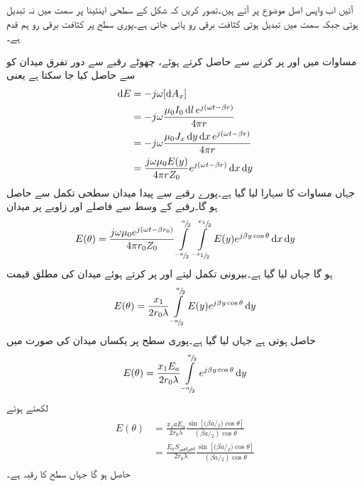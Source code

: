 آئیں اب واپس اصل موضوع پر آتے ہیں۔تصور کریں کہ شکل  کے سطحی اینٹینا پر  سمت میں نہ تبدیل ہوتی جبکہ  سمت میں تبدیل ہوتی کثافت برقی رو  پائی جاتی ہے۔پوری سطح پر کثافت برقی رو ہم قدم ہے۔

مساوات  میں  اور  پر کرنے  سے  حاصل کرتے ہوئے، چھوٹے رقبے   سے دور تفرق میدان کو  سے حاصل کیا جا سکتا ہے یعنی
\begin{gather}
\begin{aligned}
\dif E &=-j \omega [\dif A_x] \\
&=-j \omega \frac{\mu_0 I_0 \dif l \, e^{j(\omega t -\beta r)}}{4\pi r}  \\
&=-j \omega \frac{\mu_0 J_x \dif y \dif x \, e^{j(\omega t -\beta r)}}{4\pi r}  \\
&=\frac{j \omega \mu_0 E(y)}{4\pi r Z_0} e^{j(\omega t-\beta r)} \dif x \dif y
\end{aligned}
\end{gather}
جہاں مساوات  کا سہارا لیا گیا ہے۔پورے رقبے  سے پیدا میدان سطحی تکمل سے حاصل ہو گا۔رقبے کے وسط سے  فاصلے اور  زاویے پر میدان
\begin{align}
E(\theta)=\frac{j \omega \mu_0 e^{j(\omega t-\beta r_0)}}{4\pi r_0 Z_0} \int \limits_{^{-a}\!/\!_2}^{^a\!/\!_2} \int \limits_{^{-x_1}\!/\!_2}^{^{x_1}\!/\!_2} E(y) e^{j\beta y \cos \theta} \dif x \dif y
\end{align}
ہو گا جہاں  لیا گیا ہے۔بیرونی تکمل لیتے اور  پر کرتے ہوئے  میدان کی مطلق قیمت  
\begin{align}\label{مساوات_اینٹینا_فوریئر_تعلق_الف}
E(\theta)=\frac{x_1}{2 r_0 \lambda} \int \limits_{^{-a}\!/\!_2}^{^a\!/\!_2}  E(y) e^{j\beta y \cos \theta} \dif y
\end{align}
حاصل ہوتی ہے جہاں  لیا گیا ہے۔پوری سطح پر یکساں میدان  کی صورت میں
\begin{align}
E(\theta)=\frac{x_1 E_a}{2 r_0 \lambda} \int \limits_{^{-a}\!/\!_2}^{^a\!/\!_2}  e^{j\beta y \cos \theta} \dif y
\end{align}
لکھتے ہوئے
\begin{gather}
\begin{aligned}\label{مساوات_اینٹینا_سطحی_دور_میدان}
E(\theta)&=\frac{x_1 a E_a }{2 r_0 \lambda} \frac{\sin [{(\beta a}\!/\!_2)\cos \theta ]}{({\beta a}\!/\!_2)\cos \theta}\\
&=\frac{E_a S_{\text{اخراجی}}}{2 r_0 \lambda} \frac{\sin [{(\beta a}\!/\!_2)\cos \theta ]}{({\beta a}\!/\!_2)\cos \theta}
\end{aligned}
\end{gather}
حاصل ہو گا جہاں  سطح کا رقبہ ہے۔


